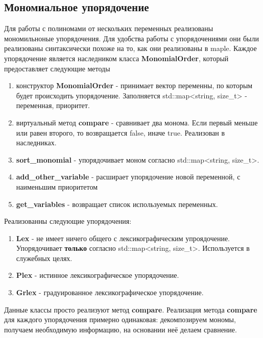 \documentclass{article}
\begin{document}
\subsection{Мономиальное упорядочение}
    Для работы с полиномами от нескольких переменных реализованы мономильноные упорядочения. Для удобства работы с упорядочениями они были 
    реализованы синтаксически похоже на то, как они реализованы в maple.
    Каждое упорядочение является наследником класса \textbf{MonomialOrder}, который предоставляет следующие методы
    \begin{enumerate}
        \item конструктор \textbf{MonomialOrder} - принимает вектор переменны, по которым будет происходить упорядочение. Заполняется std::map<string, size\_t> - переменная, приоритет.
        \item виртуальный метод \textbf{compare} - сравнивает два монома. Если первый меньше или равен второго, то возвращается false, иначе true. Реализован в наследниках.
        \item \textbf{sort\_monomial} - упорядочивает моном согласно std::map<string, size\_t>.
        \item \textbf{add\_other\_variable} - расширает упорядочение новой переменной, с наименьшим приоритетом
        \item \textbf{get\_variables} - возвращает список используемых переменных.
    \end{enumerate}

    Реализованны следующие упорядочения:
    \begin{enumerate}
        \item \textbf{Lex} - не имеет ничего общего с лексикографическим упроядочение. Упорядочивает \textbf{только} согласно std::map<string, size\_t>. Используется в служебных целях.
        \item \textbf{Plex} - истинное лексикографическое упорядочение.
        \item \textbf{Grlex} - градуированное лексикографическое упорядочение.
    \end{enumerate}

    Данные классы просто реализуют метод \textbf{compare}. Реализация метода \textbf{compare} для каждого упорядочения примерно одинаковая:
    декомпозируем мономы, получаем необходимую информацию, на основании неё делаем сравнение.
\newpage
\end{document}

